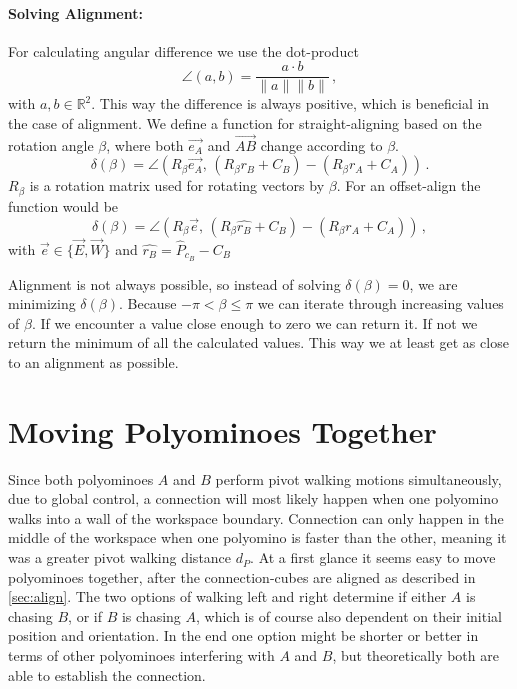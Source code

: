 \paragraph{Solving Alignment:}

For calculating angular difference we use the dot-product
\begin{equation*}
\angle (a,b) = \frac{a \cdot b}{\lVert a \rVert \lVert b \rVert} \,,
\end{equation*}
with $a,b \in \mathbb{R}^2$. This way the difference is always positive, which is beneficial in the case of alignment.
We define a function for straight-aligning based on the rotation angle $\beta$, where both $\vec{e_A}$ and $\overrightarrow{AB}$ change according to $\beta$.
\begin{equation}
\delta(\beta) = \angle \left( R_\beta \vec{e_A}, \, \left( R_\beta r_B + C_B \right) - \left( R_\beta r_A + C_A \right)\right) \,.
\end{equation}
$R_\beta$ is a rotation matrix used for rotating vectors by $\beta$.
For an offset-align the function would be
\begin{equation}
\delta(\beta) = \angle \left( R_\beta \vec{e}, \, \left( R_\beta \hat{r_B} + C_B \right) - \left( R_\beta r_A + C_A \right)\right) \,,
\end{equation}
with $\vec{e} \in \{ \vec{E}, \vec{W}\}$ and $\hat{r_B} = \hat{P}_{c_B} - C_B$

Alignment is not always possible, so instead of solving $\delta(\beta) = 0$, we are minimizing $\delta(\beta)$.
Because $-\pi < \beta \leq \pi$ we can iterate through increasing values of $\beta$.
If we encounter a value close enough to zero we can return it.
If not we return the minimum of all the calculated values.
This way we at least get as close to an alignment as possible.


\section{Moving Polyominoes Together}
\label{sec:walk_wait}

Since both polyominoes $A$ and $B$ perform pivot walking motions simultaneously, due to global control, a connection will most likely happen when one polyomino walks into a wall of the workspace boundary.
Connection can only happen in the middle of the workspace when one polyomino is faster than the other, meaning it was a greater pivot walking distance $d_P$.
At a first glance it seems easy to move polyominoes together, after the connection-cubes are aligned as described in \autoref{sec:align}.
The two options of walking left and right determine if either $A$ is chasing $B$, or if $B$ is chasing $A$, which is of course also dependent on their initial position and orientation.
In the end one option might be shorter or better in terms of other polyominoes interfering with $A$ and $B$, but theoretically both are able to establish the connection.

